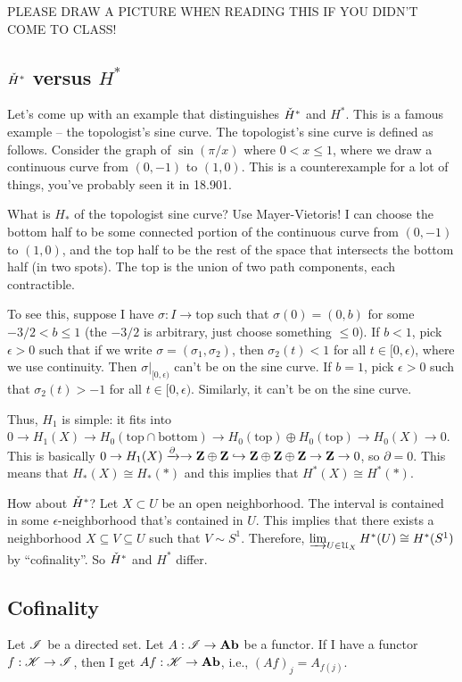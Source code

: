PLEASE DRAW A PICTURE WHEN READING THIS IF YOU DIDN'T COME TO CLASS!
\subsection{$\check{H}^\ast$ versus $H^\ast$}
Let's come up with an example that distinguishes $\check{H}^\ast$ and $H^\ast$. This is a famous example -- the topologist's sine curve. The topologist's sine curve is defined as follows. Consider the graph of $\sin(\pi/x)$ where $0<x\leq 1$, where we draw a continuous curve from $(0,-1)$ to $(1,0)$. This is a counterexample for a lot of things, you've probably seen it in 18.901.

What is $H_\ast$ of the topologist sine curve? Use Mayer-Vietoris! I can choose the bottom half to be some connected portion of the continuous curve from $(0,-1)$ to $(1,0)$, and the top half to be the rest of the space that intersects the bottom half (in two spots). The top is the union of two path components, each contractible.

To see this, suppose I have $\sigma:I\to\mathrm{top}$ such that $\sigma(0)=(0,b)$ for some $-3/2 < b\leq 1$ (the $-3/2$ is arbitrary, just choose something $\leq 0$). If $b<1$, pick $\epsilon>0$ such that if we write $\sigma=(\sigma_1,\sigma_2)$, then $\sigma_2(t)<1$ for all $t\in[0,\epsilon)$, where we use continuity. Then $\sigma|_{[0,\epsilon)}$ can't be on the sine curve. If $b=1$, pick $\epsilon>0$ such that $\sigma_2(t)>-1$ for all $t\in[0,\epsilon)$. Similarly, it can't be on the sine curve.

Thus, $H_1$ is simple: it fits into $0\to H_1(X)\to H_0(\mathrm{top}\cap\mathrm{bottom})\to H_0(\mathrm{top})\oplus H_0(\mathrm{top})\to H_0(X)\to 0$. This is basically $0\to H_1(X)\xrightarrow{\partial}\to\mathbf Z\oplus\mathbf Z\hookrightarrow\mathbf Z\oplus\mathbf Z\oplus\mathbf Z\to\mathbf Z\to 0$, so $\partial=0$. This means that $H_\ast(X)\cong H_\ast(\ast)$ and this implies that $H^\ast(X)\cong H^\ast(\ast)$.

How about $\check{H}^\ast$? Let $X\subset U$ be an open neighborhood. The interval is contained in some $\epsilon$-neighborhood that's contained in $U$. This implies that there exists a neighborhood $X\subseteq V\subseteq U$ such that $V\sim S^1$. Therefore, $\varinjlim_{U\in\mathcal{U}_X}H^\ast(U)\cong H^\ast(S^1)$ by ``cofinality''. So $\check{H}^\ast$ and $H^\ast$ differ.
\subsection{Cofinality}
Let $\mathscr I$ be a directed set. Let $A:\mathscr I\to \mathbf{Ab}$ be a functor. If I have a functor $f:\mathscr K\to\mathscr I$, then I get $Af:\mathscr K\to\mathbf{Ab}$, i.e., $(Af)_j=A_{f(j)}$.

